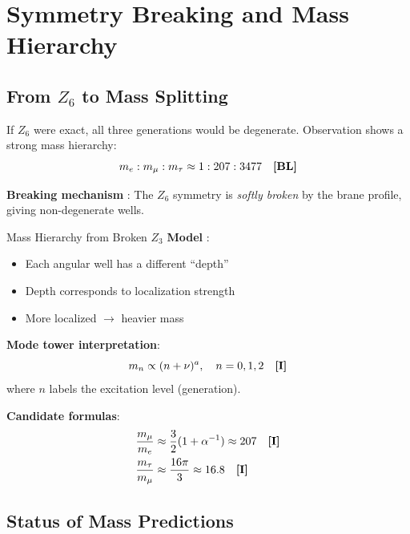 \section{Symmetry Breaking and Mass Hierarchy}
\label{sec:symmetry_breaking}

\subsection{From $Z_6$ to Mass Splitting}

If $Z_6$ were exact, all three generations would be degenerate.
Observation shows a strong mass hierarchy:
\begin{equation}
m_e : m_\mu : m_\tau \approx 1 : 207 : 3477 \quad \textbf{[BL]}
\end{equation}

\textbf{Breaking mechanism} \tagP{}: The $Z_6$ symmetry is \textit{softly broken}
by the brane profile, giving non-degenerate wells.

\begin{mechanism}{Mass Hierarchy from Broken $Z_3$}
\textbf{Model} \tagP{}:
\begin{itemize}[nosep]
\item Each angular well has a different ``depth''
\item Depth corresponds to localization strength
\item More localized $\to$ heavier mass
\end{itemize}

\textbf{Mode tower interpretation}:
\begin{equation}
m_n \propto (n + \nu)^a, \quad n = 0, 1, 2 \quad \textbf{[I]}
\end{equation}
where $n$ labels the excitation level (generation).

\textbf{Candidate formulas}:
\begin{align}
\frac{m_\mu}{m_e} &\approx \frac{3}{2}(1 + \alpha^{-1}) \approx 207 \quad \textbf{[I]} \\
\frac{m_\tau}{m_\mu} &\approx \frac{16\pi}{3} \approx 16.8 \quad \textbf{[I]}
\end{align}
\end{mechanism}

\subsection{Status of Mass Predictions}

